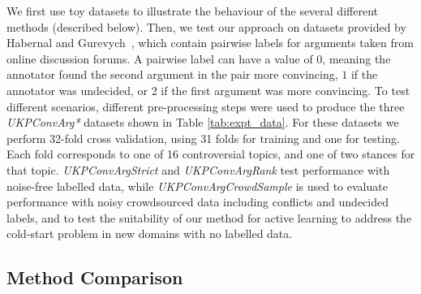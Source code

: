 We first use toy datasets to illustrate the behaviour of the several different methods (described below).
Then, 
we test our approach on datasets provided by Habernal and Gurevych~,
which contain pairwise labels for arguments taken from online discussion forums.
A pairwise label can have a value of $0$, meaning the annotator found the second argument in the pair more convincing,
$1$ if the annotator was undecided, or $2$ if the first argument was more convincing.
To test different scenarios, different pre-processing steps were used to produce the
three \emph{UKPConvArg*} datasets shown in Table \ref{tab:expt_data}.
For these datasets we perform 32-fold cross validation, using 31 folds for training and one for testing. 
Each fold corresponds to one of 16 controversial topics, and one of two stances for that topic.
\emph{UKPConvArgStrict} and \emph{UKPConvArgRank} test performance with noise-free labelled data,
while \emph{UKPConvArgCrowdSample} is used to evaluate performance with noisy crowdsourced data 
including conflicts and undecided labels, and to test the suitability of our method for active learning
to address the cold-start problem in new domains with no labelled data.
 
\subsection{Method Comparison}

